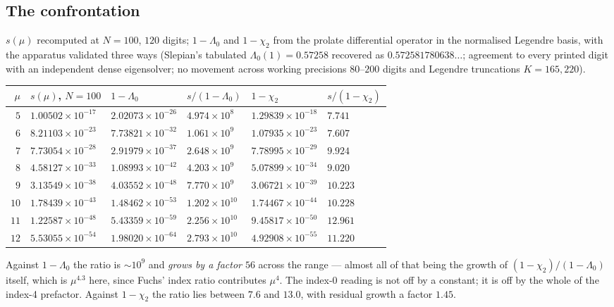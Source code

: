 \documentclass[11pt,a4paper]{article}
\theoremstyle{plain}
\theoremstyle{definition}
\theoremstyle{remark}
\begin{document}
\subsection{The confrontation}
\label{sec:confront}

$s(\mu)$ recomputed at $N=100$, $120$ digits; $1-\Lambda_0$ and $1-\chi_2$ from
the prolate differential operator in the normalised Legendre basis, with the
apparatus validated three ways (Slepian's tabulated
$\Lambda_0(1)=0.57258$ recovered as $0.572581780638\ldots$; agreement to every
printed digit with an independent dense eigensolver; no movement across working
precisions $80$--$200$ digits and Legendre truncations $K=165,220$).

\begin{center}\small
\begin{tabular}{@{}rlllll@{}}
\hline
$\mu$ & $s(\mu)$, $N=100$ & $1-\Lambda_0$ & $s/(1-\Lambda_0)$ & $1-\chi_2$ &
$s/(1-\chi_2)$ \\
\hline
$5$ & $1.00502\times10^{-17}$ & $2.02073\times10^{-26}$ & $4.974\times10^{8}$ & $1.29839\times10^{-18}$ & $7.741$ \\
$6$ & $8.21103\times10^{-23}$ & $7.73821\times10^{-32}$ & $1.061\times10^{9}$ & $1.07935\times10^{-23}$ & $7.607$ \\
$7$ & $7.73054\times10^{-28}$ & $2.91979\times10^{-37}$ & $2.648\times10^{9}$ & $7.78995\times10^{-29}$ & $9.924$ \\
$8$ & $4.58127\times10^{-33}$ & $1.08993\times10^{-42}$ & $4.203\times10^{9}$ & $5.07899\times10^{-34}$ & $9.020$ \\
$9$ & $3.13549\times10^{-38}$ & $4.03552\times10^{-48}$ & $7.770\times10^{9}$ & $3.06721\times10^{-39}$ & $10.223$ \\
$10$ & $1.78439\times10^{-43}$ & $1.48462\times10^{-53}$ & $1.202\times10^{10}$ & $1.74467\times10^{-44}$ & $10.228$ \\
$11$ & $1.22587\times10^{-48}$ & $5.43359\times10^{-59}$ & $2.256\times10^{10}$ & $9.45817\times10^{-50}$ & $12.961$ \\
$12$ & $5.53055\times10^{-54}$ & $1.98020\times10^{-64}$ & $2.793\times10^{10}$ & $4.92908\times10^{-55}$ & $11.220$ \\
\hline
\end{tabular}
\end{center}

Against $1-\Lambda_0$ the ratio is $\sim10^9$ and \emph{grows by a factor $56$}
across the range --- almost all of that being the growth of
$(1-\chi_2)/(1-\Lambda_0)$ itself, which is $\mu^{4.3}$ here, since Fuchs' index
ratio contributes $\mu^4$.  The index-0 reading is not off by a constant; it is
off by the whole of the index-4 prefactor.  Against $1-\chi_2$ the ratio lies
between $7.6$ and $13.0$, with residual growth a factor $1.45$.
\end{document}
